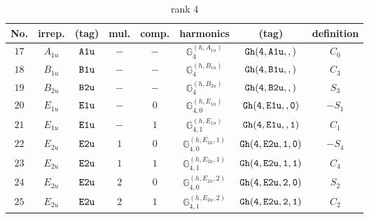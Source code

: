 \documentclass[fleqn,8pt]{jsarticle}
\begin{document}
\begin{table}[ht!]
\begin{center}
\caption{rank 4}
\renewcommand{\arraystretch}{1.3}
\begin{tabular}{cccccccc} \hline \hline
No. & irrep. & (tag) & mul. & comp. & harmonics & (tag) & definition \\ \hline
$ 17 $ & $ A_{1u} $ & $ {\tt A1u} $ & $ - $ & $ - $ & $ \mathbb{G}_{4}^{(h,A_{1u})} $ & $ {\tt Gh(4,A1u,,)} $ & $ C_{0} $ \\
$ 18 $ & $ B_{1u} $ & $ {\tt B1u} $ & $ - $ & $ - $ & $ \mathbb{G}_{4}^{(h,B_{1u})} $ & $ {\tt Gh(4,B1u,,)} $ & $ C_{3} $ \\
$ 19 $ & $ B_{2u} $ & $ {\tt B2u} $ & $ - $ & $ - $ & $ \mathbb{G}_{4}^{(h,B_{2u})} $ & $ {\tt Gh(4,B2u,,)} $ & $ S_{3} $ \\
$ 20 $ & $ E_{1u} $ & $ {\tt E1u} $ & $ - $ & $ 0 $ & $ \mathbb{G}_{4,0}^{(h,E_{1u})} $ & $ {\tt Gh(4,E1u,,0)} $ & $ - S_{1} $ \\
$ 21 $ & $ E_{1u} $ & $ {\tt E1u} $ & $ - $ & $ 1 $ & $ \mathbb{G}_{4,1}^{(h,E_{1u})} $ & $ {\tt Gh(4,E1u,,1)} $ & $ C_{1} $ \\
$ 22 $ & $ E_{2u} $ & $ {\tt E2u} $ & $ 1 $ & $ 0 $ & $ \mathbb{G}_{4,0}^{(h,E_{2u},1)} $ & $ {\tt Gh(4,E2u,1,0)} $ & $ - S_{4} $ \\
$ 23 $ & $ E_{2u} $ & $ {\tt E2u} $ & $ 1 $ & $ 1 $ & $ \mathbb{G}_{4,1}^{(h,E_{2u},1)} $ & $ {\tt Gh(4,E2u,1,1)} $ & $ C_{4} $ \\
$ 24 $ & $ E_{2u} $ & $ {\tt E2u} $ & $ 2 $ & $ 0 $ & $ \mathbb{G}_{4,0}^{(h,E_{2u},2)} $ & $ {\tt Gh(4,E2u,2,0)} $ & $ S_{2} $ \\
$ 25 $ & $ E_{2u} $ & $ {\tt E2u} $ & $ 2 $ & $ 1 $ & $ \mathbb{G}_{4,1}^{(h,E_{2u},2)} $ & $ {\tt Gh(4,E2u,2,1)} $ & $ C_{2} $ \\
 \hline \hline
\end{tabular}
\end{center}
\end{table}
\end{document}
